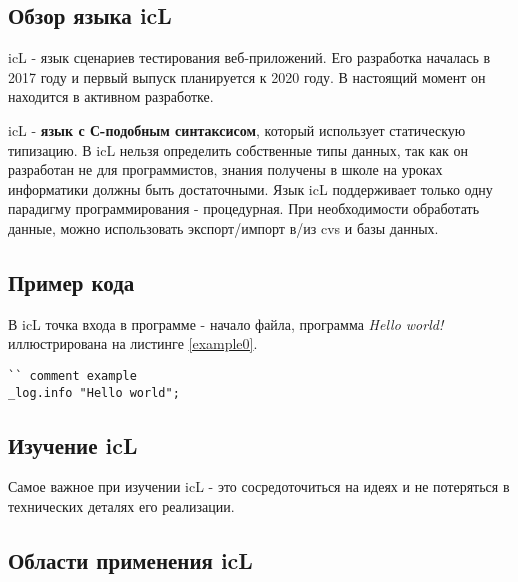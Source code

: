 \documentclass[a4paper, 14pt]{extarticle}
\begin{document}
\subsection{Обзор языка icL}
	
	icL - язык сценариев тестирования веб-приложений. Его разработка началась в 2017 году и первый выпуск планируется к 2020 году. В настоящий момент он находится в активном разработке.
	
	icL - \textbf{язык с С-подобным синтаксисом}, который использует статическую типизацию. В icL нельзя определить собственные типы данных, так как он разработан не для программистов, знания получены в школе на уроках информатики должны быть достаточными. Язык icL поддерживает только одну парадигму программирования - процедурная. При необходимости обработать данные, можно использовать экспорт/импорт в/из cvs и базы данных.
	
\subsection{Пример кода}

	В icL точка входа в программе - начало файла, программа \textit{Hello world!} иллюстрирована на листинге \ref{example0}.
	
\begin{lstlisting}[caption=Пример, label=example0]
`` comment example
_log.info "Hello world";
\end{lstlisting}
  
\subsection{Изучение icL}
	
	Самое важное при изучении icL - это сосредоточиться на идеях и не потеряться в технических деталях его реализации.
	
\subsection{Области применения icL}
	
\end{document}

